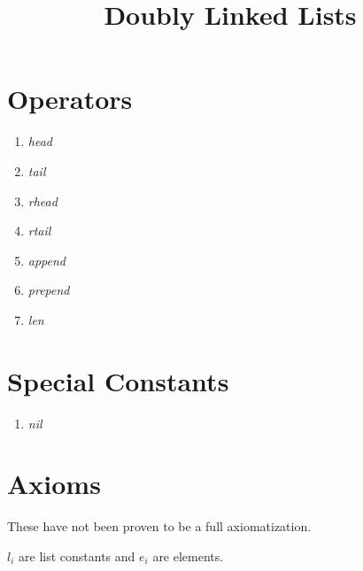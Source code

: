 \documentclass[10pt,twocolumn,letterpaper]{article}
\begin{document}
\title{Doubly Linked Lists}
\maketitle

\section{Operators}

\begin{enumerate}
\item \textit{head}
\item \textit{tail}
\item \textit{rhead}
\item \textit{rtail}
\item \textit{append}
\item \textit{prepend}
\item \textit{len}
\end{enumerate}

\section{Special Constants}
\begin{enumerate}
\item \textit{nil}
\end{enumerate}

\section{Axioms}

These have not been proven to be a full axiomatization.

$l_i$ are list constants and $e_i$ are elements.
\end{document}

